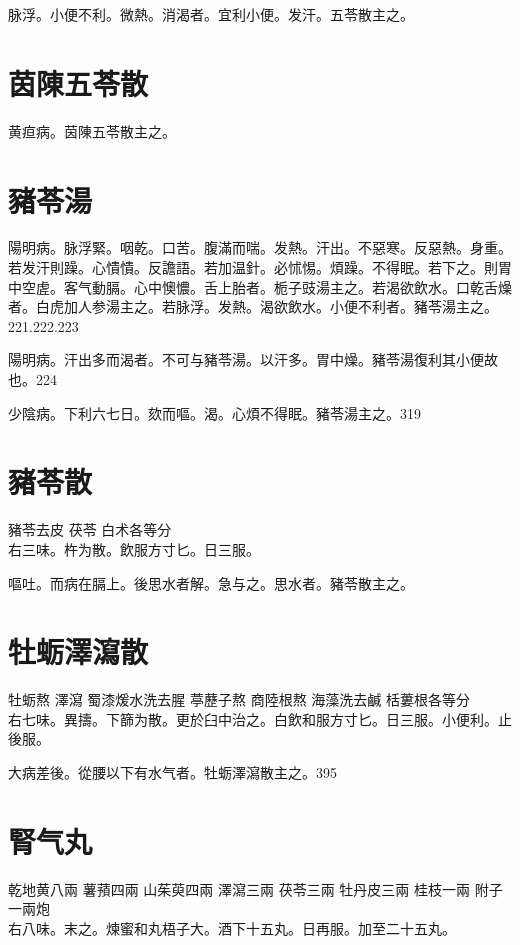 脉浮。小便不利。微熱。消渴者。宜利小便。发汗。五苓散主之。

\section{茵陳五苓散}

黄疸病。茵陳五苓散主之。

\section{豬苓湯}

陽明病。脉浮緊。咽乾。口苦。腹滿而喘。发熱。汗出。不惡寒。反惡熱。身重。若发汗則躁。心憒憒。反譫語。若加温針。必怵惕。煩躁。不得眠。若下之。則胃中空虗。客气動膈。心中懊憹。舌上胎者。栀子{\khaaitp 豉}湯主之。若渴欲飲水。口乾舌燥者。白虎{\khaaitp 加人参}湯主之。若脉浮。发熱。渴欲飲水。小便不利者。豬苓湯主之。221.222.223

陽明病。汗出多而渴者。不可与豬苓湯。以汗多。胃中燥。豬苓湯復利其小便故也。224

少陰病。下利六七日。欬而嘔。渴。心煩不得眠。豬苓湯主之。319

\section{豬苓散}

豬苓{\scriptsize\khaaitp 去皮} 茯苓{ }白术{\scriptsize 各等分}\\
右三味。杵为散。飲服方寸匕。日三服。

嘔吐。而病在膈上。後思水者解。急与之。思水者。豬苓散主之。

\section{牡蛎澤瀉散}

牡蛎{\scriptsize 熬} 澤瀉 蜀漆{\scriptsize 煖水洗去腥} 葶藶子{\scriptsize 熬} 商陸根{\scriptsize 熬} 海藻{\scriptsize 洗去鹹} 栝蔞根{\scriptsize 各等分}\\
右七味。異擣。下篩为散。更於臼中治之。白飲和服方寸匕。日三服。小便利。止後服。

大病差後。從腰以下有水气者。牡蛎澤瀉散主之。395

\section{腎气丸}

乾地黄{\scriptsize 八兩} 薯蕷{\scriptsize 四兩} 山茱萸{\scriptsize 四兩} 澤瀉{\scriptsize 三兩} 茯苓{\scriptsize 三兩} 牡丹皮{\scriptsize 三兩} 桂枝{\scriptsize 一兩} 附子{\scriptsize 一兩炮}\\
右八味。末之。煉蜜和丸梧子大。酒下十五丸。日再服。{\khaaitp 加至二十五丸。}


